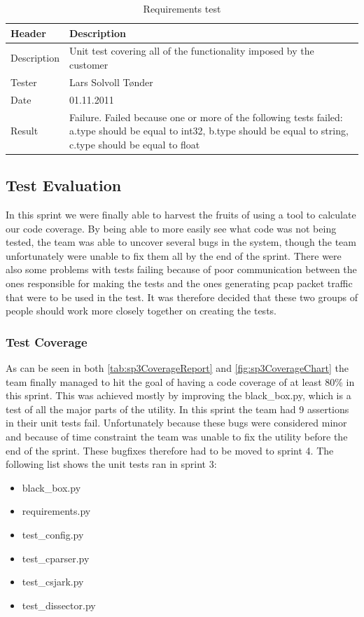 \begin{table}[!htb] \footnotesize \center
\caption{Requirements test \label{tab:sp3TID25}}
\begin{tabular}{l l}
	\toprule
	Header & Description \\
	\midrule
	Description & Unit test covering all of the functionality imposed by the customer \\
	Tester & Lars Solvoll Tønder\\
	Date & 01.11.2011\\
	Result & Failure. Failed because one or more of the following tests failed: a.type should be equal to int32, b.type should be equal to string, c.type should be equal to float\\
	\bottomrule
\end{tabular}
\end{table}

\subsection{Test Evaluation}
In this sprint we were finally able to harvest the fruits of using a tool to calculate our code coverage. By being able to more easily see what code was not being tested, the team was able to uncover several bugs in the system, though the team unfortunately were unable to fix them all by the end of the sprint. There were also some problems with tests failing because of poor communication between the ones responsible for making the tests and the ones generating pcap packet traffic that were to be used in the test. It was therefore decided that these two groups of people should work more closely together on creating the tests.



\subsubsection{Test Coverage}

As can be seen in both \autoref{tab:sp3CoverageReport} and \autoref{fig:sp3CoverageChart} the team finally managed to hit the goal of having a code coverage of at least 80\% in this sprint. This was achieved mostly by improving the black\_box.py, which is a test of all the major parts of the utility. In this sprint the team had 9 assertions in their unit tests fail. Unfortunately because these bugs were considered minor and because of time constraint the team was unable to fix the utility before the end of the sprint. These bugfixes therefore had to be moved to sprint 4. The following list shows the unit tests ran in sprint 3:
\begin{itemize}
	\item black\_box.py
	\item requirements.py
	\item test\_config.py
	\item test\_cparser.py
	\item test\_csjark.py
	\item test\_dissector.py
\end{itemize}

